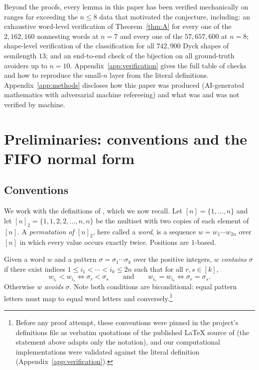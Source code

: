 \documentclass[11pt]{article}
\theoremstyle{definition}
\theoremstyle{remark}
\newcommand{\nn}{[n]_2}
\begin{document}
Beyond the proofs, every lemma in this paper has been verified mechanically
on ranges far exceeding the $n\le 8$ data that motivated the conjecture,
including: an exhaustive word-level verification of
Theorem~\ref{thm:A} for every one of the $2{,}162{,}160$ nonnesting words at
$n=7$ and every one of the $57{,}657{,}600$ at $n=8$; shape-level
verification of the classification for all $742{,}900$ Dyck shapes of
semilength $13$; and an end-to-end check of the bijection on all
ground-truth avoiders up to $n=10$. Appendix~\ref{app:verification} gives the
full table of checks and how to reproduce the small-$n$ layer from the
literal definitions. Appendix~\ref{app:methods} discloses how this paper was
produced (AI-generated mathematics with adversarial machine refereeing) and
what was and was not verified by machine.

\section{Preliminaries: conventions and the FIFO normal form}\label{sec:prelim}

\subsection{Conventions}\label{sec:conventions}

We work with the definitions of \cite{ElizaldeLuo}, which we now recall. Let $[n]=\{1,\dots,n\}$ and let $\nn=\{1,1,2,2,\dots,n,n\}$ be the
multiset with two copies of each element of $[n]$. A \emph{permutation of
$\nn$}, here called a \emph{word}, is a sequence $w=w_1\cdots w_{2n}$ over
$[n]$ in which every value occurs exactly twice. Positions are $1$-based.

Given a word $w$ and a pattern $\sigma=\sigma_1\cdots\sigma_k$ over the
positive integers, $w$ \emph{contains} $\sigma$ if there exist indices
$1\le i_1<\cdots<i_k\le 2n$ such that for all $r,s\in[k]$,
\[
  w_{i_r}<w_{i_s} \iff \sigma_r<\sigma_s
  \qquad\text{and}\qquad
  w_{i_r}=w_{i_s} \iff \sigma_r=\sigma_s .
\]
Otherwise $w$ \emph{avoids} $\sigma$. Note both conditions are
biconditional: equal pattern letters must map to equal word letters and
conversely.\footnote{Before any proof attempt, these conventions were pinned
in the project's definitions file as verbatim quotations of the published
LaTeX source of \cite{ElizaldeLuo} (the statement above adapts only the
notation), and our computational implementations were validated against the
literal definition (Appendix~\ref{app:verification}).}
\end{document}
